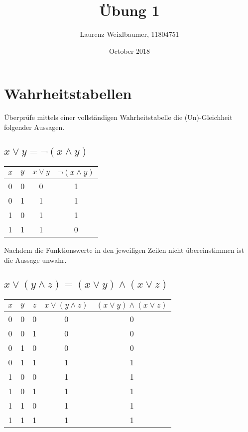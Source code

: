 \documentclass{article}
\title{\vspace{-2ex}Übung 1}
\author{Laurenz Weixlbaumer, 11804751}
\date{October 2018}
\begin{document}
\maketitle

\section{Wahrheitstabellen}
Überprüfe mittels einer vollständigen Wahrheitstabelle die (Un)-Gleichheit folgender Aussagen.

\subsection{$x \lor y = \neg{(x \land y)}$}

\begin{center}
\begin{tabular}{c | c || c | c}
    $x$ & $y$ & $x \lor y$ & $\neg(x \land y)$\\
    \hline
    0 & 0 & 0 & 1\\
    0 & 1 & 1 & 1\\
    1 & 0 & 1 & 1\\
    1 & 1 & 1 & 0
\end{tabular}
\end{center}

\vspace{10px}

Nachdem die Funktionswerte in den jeweiligen Zeilen nicht übereinstimmen ist die Aussage unwahr.

\vspace{10px}

\subsection{$x \lor (y \land z) = (x \lor y) \land (x \lor z)$}

\begin{center}
\begin{tabular}{c | c | c || c | c}
    $x$ & $y$ & $z$ & $x \lor (y \land z)$ & $(x \lor y) \land (x \lor z)$\\
    \hline
    0 & 0 & 0 & 0 & 0\\
    0 & 0 & 1 & 0 & 0\\
    0 & 1 & 0 & 0 & 0\\
    0 & 1 & 1 & 1 & 1\\
    1 & 0 & 0 & 1 & 1\\
    1 & 0 & 1 & 1 & 1\\
    1 & 1 & 0 & 1 & 1\\
    1 & 1 & 1 & 1 & 1
\end{tabular}
\end{center}
\end{document}
